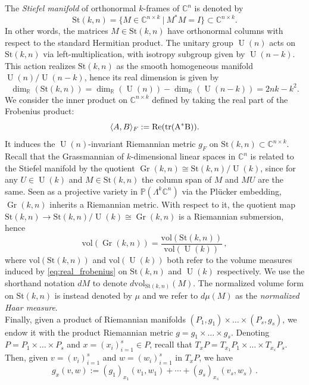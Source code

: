\documentclass{article}
\theoremstyle{definition}
\DeclareMathOperator{\Gr}{Gr}
\DeclareMathOperator{\U}{U}
\newcommand{\R}{\mathbb{R}}
\newcommand{\C}{\mathbb{C}}
\newcommand{\vol}{\mathrm{vol}}
\newcommand{\St}{\mathrm{St}}
\renewcommand{\P}{\mathbb{P}}
\begin{document}
The \emph{Stiefel manifold} of orthonormal $k$-frames of $\C^n$ is denoted by 
\begin{equation*}
    \St(k,n)=\{M \in \C^{n\times k} \ | \ M^*M = I \} \subset \C^{n\times k}.
\end{equation*}
In other words, the matrices $M \in \St(k,n)$ have orthonormal columns with respect to the standard Hermitian product. The unitary group $\U(n)$ acts on $\St(k,n)$ via left-multiplication, with isotropy subgroup given by $\U(n-k)$. This action realizes $\St(k,n)$ as the smooth homogeneous manifold $\U(n) / \U(n-k)$, hence its real dimension is given by 
\begin{equation}\label{eq:stiefel_dim}
    \dim_{\R}(\St(k,n))=\dim_{\R}(\U(n)) - \dim_{\R}(\U(n-k)) = 2nk - k^2.
\end{equation}
We consider the inner product on $\C^{n\times k}$ defined by taking the real part of the Frobenius product:
\begin{equation}\label{eq:real_frobenius}
    \langle A,B\rangle_F : = {\rm Re}(\rm tr(A^*B)). 
\end{equation}
It induces the $\U(n)$-invariant Riemannian metric $g_{F}$ on $\St(k,n) \subset \C^{n\times k}$.  
Recall that the Grassmannian of $k$-dimensional linear spaces in $\C^n$ is related to the Stiefel manifold by the quotient $\Gr(k,n) \cong \St(k,n)/\U(k)$, since for any $U \in \U(k)$ and $M \in \St(k,n)$ the column span of $M$ and $MU$  are the same. Seen as a projective variety in $\P(\Lambda^k\C^n)$ via the Pl\"ucker embedding, $\Gr(k,n)$ inherits a Riemannian metric. With respect to it, the quotient map $\St(k,n) \rightarrow \St(k,n)/\U(k) \cong  \Gr(k,n)$ is a Riemannian submersion, hence
\begin{equation}\label{eq:vol_gr}
    \vol(\Gr(k,n)) = \frac{\vol(\St(k,n))}{\vol(\U(k))}\,,
\end{equation}
where $\vol(\St(k,n))$ and $\vol(\U(k))$ both refer to the volume measures induced by \eqref{eq:real_frobenius} on $\St(k,n)$ and $\U(k)$ respectively. We use the shorthand notation $dM$ to denote $d\vol_{\St(k,n)}(M)$. The normalized volume form on $\St(k,n)$ is instead denoted by $\mu$ and we refer to $d\mu(M)$ as the \emph{normalized Haar measure}.   \\

Finally, given a product of Riemannian manifolds $(P_1,g_1)\times \dots \times (P_s,g_s)$, we endow it with the product Riemannian metric $g = g_1\times\dots\times g_s$. Denoting $P=P_1\times\dots\times P_s$ and $x=(x_i)_{i=1}^s \in P$, recall that $T_xP = T_{x_1}P_1\times\dots\times T_{x_s}P_s$. Then, given $v=(v_i)_{i=1}^s$ and $w=(w_i)_{i=1}^s$ in  $T_{x}P$, we have 
\begin{equation*}
    g_x(v,w):= (g_1)_{x_1}(v_1,w_1) + \cdots  +(g_s)_{x_s}(v_s,w_s) \,.
\end{equation*}
\end{document}
